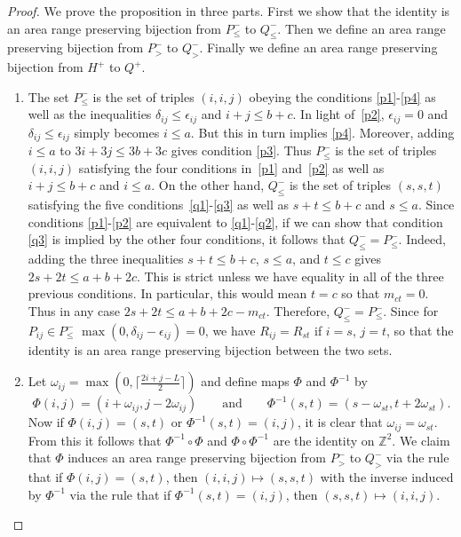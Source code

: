 \documentclass[11pt,reqno]{amsart}
\newcommand{\mms}{_}
\theoremstyle{definition}
\numberwithin{equation}{section}
\begin{document}
\begin{proof}
We prove the proposition in three parts. First we show that the identity is an area range preserving bijection from 
$P_{\leqslant}^-$ to $Q_{\leqslant}^-$. Then we define an area range preserving bijection from $P_>^-$ to $Q_>^-$. 
Finally we define an area range preserving bijection from $H^+$ to $Q^+$.

\begin{enumerate}
\item The set $P_{\leqslant}^-$ is the set of triples $(i,i,j)$ obeying the conditions \eqref{p1}-\eqref{p4} as well as the 
inequalities $\delta_{ij} \leqslant \epsilon_{ij}$ and $i+j \leqslant b+c$. In light of~\eqref{p2}, $\epsilon_{ij}=0$ and 
$\delta_{ij} \leqslant \epsilon_{ij}$ simply becomes $i \leqslant a$.  But this in turn implies \eqref{p4}.  Moreover, 
adding $i \leqslant a$ to $3i+3j \leqslant 3b+3c$ gives condition \eqref{p3}.  Thus $P_{\leqslant}^-$ is the set of triples 
$(i,i,j)$ satisfying the four conditions in~\eqref{p1} and~\eqref{p2} as well as $i+j \leqslant b+c$ and $i \leqslant a$. 
On the other hand,  $Q_{\leqslant}^-$ is the set of triples $(s,s,t)$ satisfying the five conditions~\eqref{q1}-\eqref{q3} 
as well as $s+t \leqslant b+c$ and $s \leqslant a$. Since conditions \eqref{p1}-\eqref{p2} are equivalent to
\eqref{q1}-\eqref{q2}, if we can show that condition \eqref{q3} is implied by the other four conditions, it follows that 
$Q_{\leqslant}^-=P_{\leqslant}^-$.  Indeed, adding the three inequalities $s+t \leqslant b+c$, $s \leqslant a$, and 
$t \leqslant c$ gives $2s+2t \leqslant a+b+2c$.  This is strict unless we have equality in all of the three previous conditions. 
In particular, this would mean $t=c$ so that $m_{ct}=0$. Thus in any case $2s+2t \leqslant a+b+2c-m_{ct}$.  Therefore,
$Q_{\leqslant}^-=P_{\leqslant}^-$.  Since for $P_{ij} \in P_{\leqslant}^-$ $\max(0,\delta_{ij}-\epsilon_{ij})=0$, we have 
$R_{ij}=R\mms{st}$ if $i=s$, $j=t$, so that the identity is an area range preserving bijection between the two sets.

\item Let $\omega_{ij}=\max(0,\lceil\frac{2i+j-L}{2}\rceil)$ and define maps $\Phi$ and $\Phi^{-1}$ by
\[
	 \Phi(i,j)=(i+\omega_{ij},j-2\omega_{ij}) \qquad \text{and} \qquad  \Phi^{-1}(s,t)=(s-\omega_{st}, t+2\omega_{st}).
\]
Now if $\Phi(i,j)=(s,t)$ or $\Phi^{-1}(s,t)=(i,j)$, it is clear that $\omega_{ij}=\omega_{st}$.  From this it follows that 
$\Phi^{-1} \circ \Phi$ and $\Phi \circ \Phi^{-1}$ are the identity on $\mathbb{Z}^2$.
We claim that $\Phi$ induces an area range preserving bijection from $P_>^-$ to $Q_>^-$ via the rule that if 
$\Phi(i,j)=(s,t)$, then $(i,i,j) \mapsto (s,s,t)$ with the inverse  induced by $\Phi^{-1}$  via the rule that if $\Phi^{-1}(s,t)=(i,j)$,
then $(s,s,t) \mapsto (i,i,j)$.  


\end{enumerate}
\end{proof}
\end{document}
